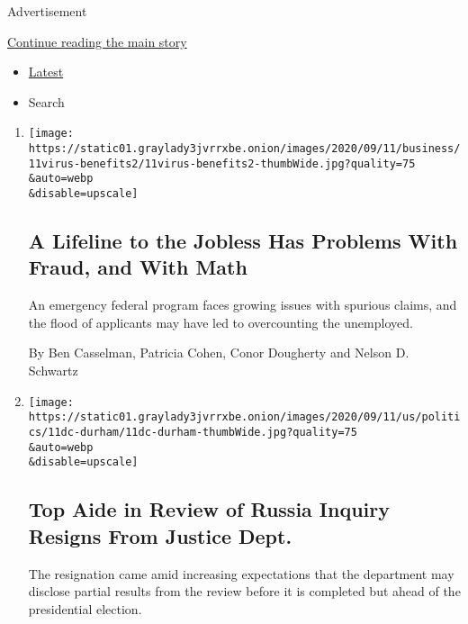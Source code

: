 Advertisement

\protect\hyperlink{after-mid1}{Continue reading the main story}

\begin{itemize}
\tightlist
\item
  \protect\hyperlink{stream-panel}{Latest}
\item
  Search
\end{itemize}

\begin{enumerate}
\def\labelenumi{\arabic{enumi}.}
\item
  \href{/2020/09/11/business/economy/pandemic-unemployment-assistance-fraud.html}{}

  \texttt{[image: https://static01.graylady3jvrrxbe.onion/images/2020/09/11/business/11virus-benefits2/11virus-benefits2-thumbWide.jpg?quality=75\\\&auto=webp\\\&disable=upscale]}

  \hypertarget{a-lifeline-to-the-jobless-has-problems-with-fraud-and-with-math}{%
  \subsection{A Lifeline to the Jobless Has Problems With Fraud, and
  With
  Math}\label{a-lifeline-to-the-jobless-has-problems-with-fraud-and-with-math}}

  An emergency federal program faces growing issues with spurious
  claims, and the flood of applicants may have led to overcounting the
  unemployed.

  By Ben Casselman, Patricia Cohen, Conor Dougherty and Nelson D.
  Schwartz
\item
  \href{/2020/09/11/us/politics/nora-dannehy-durham-russia-investigation.html}{}

  \texttt{[image: https://static01.graylady3jvrrxbe.onion/images/2020/09/11/us/politics/11dc-durham/11dc-durham-thumbWide.jpg?quality=75\\\&auto=webp\\\&disable=upscale]}

  \hypertarget{top-aide-in-review-of-russia-inquiry-resigns-from-justice-dept-1}{%
  \subsection{Top Aide in Review of Russia Inquiry Resigns From Justice
  Dept.}\label{top-aide-in-review-of-russia-inquiry-resigns-from-justice-dept-1}}

  The resignation came amid increasing expectations that the department
  may disclose partial results from the review before it is completed
  but ahead of the presidential election.


\end{enumerate}
